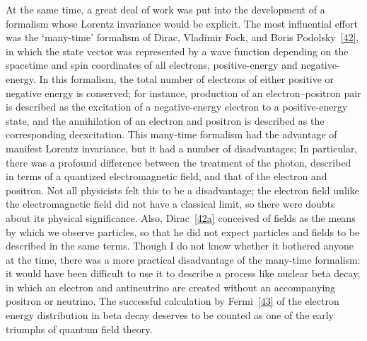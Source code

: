 At the same time, a great deal of work was put into the development of a
formalism whose Lorentz invariance would be explicit. The most influential
effort was the `many-time' formalism of Dirac, Vladimir Fock, and Boris
Podolsky~\hyperref[ref:1.42]{[42]}, in which the state vector was represented by a wave function
depending on the spacetime and spin coordinates of all electrons,
positive-energy and negative-energy. In this formalism, the total number of
electrons of either positive or negative energy is conserved; for instance,
production of an electron--positron pair is described as the excitation of a
negative-energy electron to a positive-energy state, and the annihilation of
an electron and positron is described as the corresponding deexcitation. This
many-time formalism had the advantage of manifest Lorentz invariance, but it
had a number of disadvantages; In particular, there was a profound difference
between the treatment of the photon, described in terms of a quantized
electromagnetic field, and that of the electron and positron. Not all
physicists felt this to be a disadvantage; the electron field unlike the
electromagnetic field did not have a classical limit, so there were doubts
about its physical significance. Also, Dirac~\hyperref[ref:1.42a]{[42a]} conceived of fields as the
means by which we observe particles, so that he did not expect particles and
fields to be described in the same terms. Though I do not know whether it
bothered anyone at the time, there was a more practical disadvantage of the
many-time formalism: it would have been difficult to use it to describe a
process like nuclear beta decay, in which an electron and antineutrino are
created without an accompanying positron or neutrino. The successful
calculation by Fermi~\hyperref[ref:1.43]{[43]} of the electron energy distribution in beta decay
deserves to be counted as one of the early triumphs of quantum field theory.

